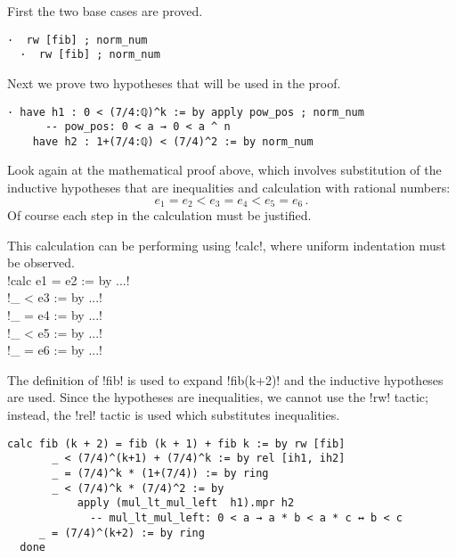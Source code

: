 
First the two base cases are proved.
\begin{Verbatim}[firstnumber=last]
  ·  rw [fib] ; norm_num
  ·  rw [fib] ; norm_num
\end{Verbatim}

Next we prove two hypotheses that will be used in the proof.
\begin{Verbatim}[firstnumber=last]
  · have h1 : 0 < (7/4:ℚ)^k := by apply pow_pos ; norm_num
      -- pow_pos: 0 < a → 0 < a ^ n
    have h2 : 1+(7/4:ℚ) < (7/4)^2 := by norm_num
\end{Verbatim}

Look again at the mathematical proof above, which involves substitution of the inductive hypotheses that are inequalities and calculation with rational numbers:
\[
e_1 = e_2 < e_3 = e_4 < e_5 = e_6\,.
\]
Of course each step in the calculation must be justified.

\newpage

This calculation can be performing using !calc!, where uniform indentation must be observed.\\
\indnt{}!calc e1 = e2 := by ...!\\
\indnt{}\indnt{}!_ < e3  := by ...!\\
\indnt{}\indnt{}!_ = e4  := by ...!\\
\indnt{}\indnt{}!_ < e5  := by ...!\\
\indnt{}\indnt{}!_ = e6  := by ...!

The definition of !fib! is used to expand !fib(k+2)! and the inductive hypotheses are used. Since the hypotheses are inequalities, we cannot use the !rw! tactic; instead, the !rel! tactic is used which substitutes inequalities.
\begin{Verbatim}[firstnumber=last]
    calc fib (k + 2) = fib (k + 1) + fib k := by rw [fib]
       _ < (7/4)^(k+1) + (7/4)^k := by rel [ih1, ih2]
       _ = (7/4)^k * (1+(7/4)) := by ring
       _ < (7/4)^k * (7/4)^2 := by
           apply (mul_lt_mul_left  h1).mpr h2
             -- mul_lt_mul_left: 0 < a → a * b < a * c ↔ b < c
     _ = (7/4)^(k+2) := by ring
  done
\end{Verbatim}


